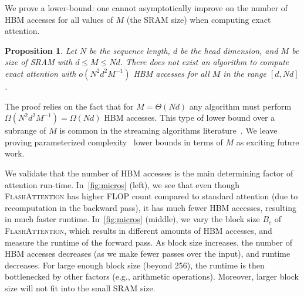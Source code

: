 \documentclass{article}
\newcommand{\sysname}{\textsc{FlashAttention}\xspace}
\newtheorem{proposition}[theorem]{Proposition}
\begin{document}
We prove a lower-bound: one cannot asymptotically improve on the number of HBM
accesses for all values of $M$ (the SRAM size) when computing exact attention.
\begin{proposition}\label{thm:lower_bound}
  Let $N$ be the sequence length, $d$ be the head dimension, and $M$ be size of
  SRAM with $d \leq M \leq Nd$.
  There does not exist an algorithm to compute exact attention with
  $o(N^2d^2 M^{-1})$ HBM accesses for all $M$ in the range
  $[d, Nd]$.
\end{proposition}
The proof relies on the fact that for $M = \Theta(Nd)$ any algorithm must perform
$\Omega ( N^2d^2M^{-1} ) = \Omega(Nd)$ HBM accesses.
This type of lower bound over a subrange of $M$ is common in the streaming
algorithms literature~\citep{woodruff2004optimal}.
We leave proving parameterized complexity~\citep{flum2006parameterized} lower
bounds in terms of $M$ as exciting future work.

We validate that the number of HBM accesses is the main determining factor of
attention run-time.
In~\cref{fig:micros} (left), we see that even though \sysname has
higher FLOP count compared to standard attention (due to recomputation in the
backward pass), it has much fewer HBM accesses, resulting in much faster
runtime.
In~\cref{fig:micros} (middle), we vary the block size $B_c$ of \sysname, which results in different amounts of HBM accesses, and measure the
runtime of the forward pass.
As block size increases, the number of HBM accesses decreases (as we make fewer
passes over the input), and runtime decreases.
For large enough block size (beyond 256), the runtime is then bottlenecked by
other factors (e.g., arithmetic operations).
Moreover, larger block size will not fit into the small SRAM size.
\end{document}
